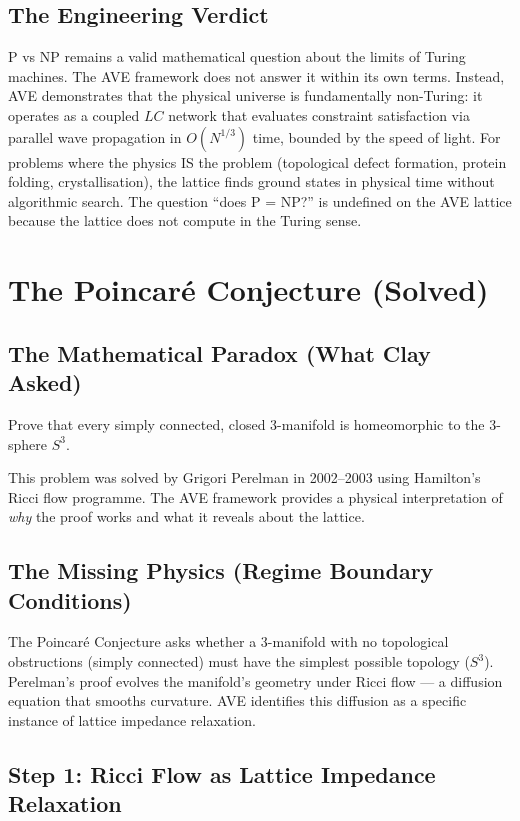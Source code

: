 \subsection{The Engineering Verdict}
P vs NP remains a valid mathematical question about the limits of Turing machines. The AVE framework does not answer it within its own terms. Instead, AVE demonstrates that the physical universe is fundamentally non-Turing: it operates as a coupled $LC$ network that evaluates constraint satisfaction via parallel wave propagation in $O(N^{1/3})$ time, bounded by the speed of light. For problems where the physics IS the problem (topological defect formation, protein folding, crystallisation), the lattice finds ground states in physical time without algorithmic search. The question ``does P = NP?'' is undefined on the AVE lattice because the lattice does not compute in the Turing sense.

\section{The Poincar\'e Conjecture (Solved)}
\label{sec:poincare_millennium}

\subsection{The Mathematical Paradox (What Clay Asked)}
Prove that every simply connected, closed 3-manifold is homeomorphic to the 3-sphere $S^3$.

This problem was solved by Grigori Perelman in 2002--2003 using Hamilton's Ricci flow programme. The AVE framework provides a physical interpretation of \textit{why} the proof works and what it reveals about the lattice.

\subsection{The Missing Physics (Regime Boundary Conditions)}
The Poincar\'e Conjecture asks whether a 3-manifold with no topological obstructions (simply connected) must have the simplest possible topology ($S^3$). Perelman's proof evolves the manifold's geometry under Ricci flow --- a diffusion equation that smooths curvature. AVE identifies this diffusion as a specific instance of lattice impedance relaxation.

\subsection{Step 1: Ricci Flow as Lattice Impedance Relaxation}

